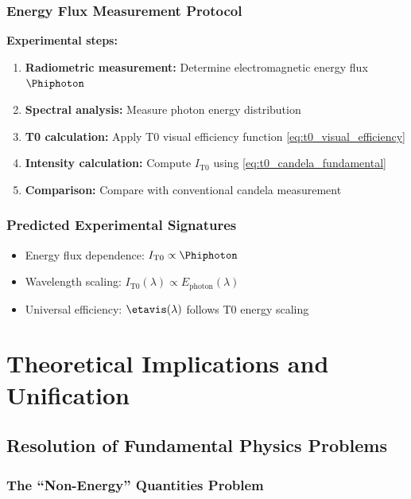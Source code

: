 \subsubsection{Energy Flux Measurement Protocol}
\label{subsubsec:candela_energy_protocol}

\textbf{Experimental steps:}
\begin{enumerate}
	\item \textbf{Radiometric measurement:} Determine electromagnetic energy flux $\Phiphoton$
	\item \textbf{Spectral analysis:} Measure photon energy distribution
	\item \textbf{T0 calculation:} Apply T0 visual efficiency function \cref{eq:t0_visual_efficiency}
	\item \textbf{Intensity calculation:} Compute $I_{\text{T0}}$ using \cref{eq:t0_candela_fundamental}
	\item \textbf{Comparison:} Compare with conventional candela measurement
\end{enumerate}

\subsubsection{Predicted Experimental Signatures}
\label{subsubsec:candela_experimental_signatures}

\begin{itemize}
	\item Energy flux dependence: $I_{\text{T0}} \propto \Phiphoton$
	\item Wavelength scaling: $I_{\text{T0}}(\lambda) \propto E_{\text{photon}}(\lambda)$
	\item Universal efficiency: $\etavis(\lambda)$ follows T0 energy scaling
\end{itemize}

\section{Theoretical Implications and Unification}
\label{sec:theoretical_implications}

\subsection{Resolution of Fundamental Physics Problems}
\label{subsec:resolution_fundamental_problems}

\subsubsection{The ``Non-Energy'' Quantities Problem}
\label{subsubsec:non_energy_problem_resolved}

